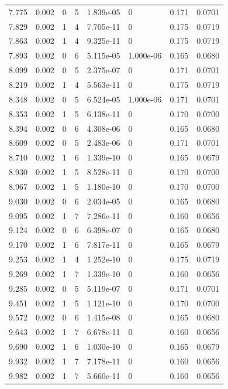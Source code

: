 \documentclass[preview]{standalone}
\begin{document}
{{{\begin{tabular}{L{1.2cm}C{1.2cm} C{0.3cm}C{0.5cm} C{1.4cm}C{1.4cm} C{1.4cm}C{1.4cm}}
  7.775  &  0.002  & 0     &  5 &  1.839e-05  & 0  & 0.171 &  0.0701   \\ 
  7.829  &  0.002  & 1     &  4 &  7.705e-11  & 0  & 0.175 &  0.0719   \\ 
  7.863  &  0.002  & 1     &  4 &  9.325e-11  & 0  & 0.175 &  0.0719   \\ 
  7.893  &  0.002  & 0     &  6 &  5.115e-05  & 1.000e-06  & 0.165 &  0.0680   \\ 
  8.099  &  0.002  & 0     &  5 &  2.375e-07  & 0  & 0.171 &  0.0701   \\ 
  8.219  &  0.002  & 1     &  4 &  5.563e-11  & 0  & 0.175 &  0.0719   \\ 
  8.348  &  0.002  & 0     &  5 &  6.524e-05  & 1.000e-06  & 0.171 &  0.0701   \\ 
  8.353  &  0.002  & 1     &  5 &  6.138e-11  & 0  & 0.170 &  0.0700   \\ 
  8.394  &  0.002  & 0     &  6 &  4.308e-06  & 0  & 0.165 &  0.0680   \\ 
  8.609  &  0.002  & 0     &  5 &  2.483e-06  & 0  & 0.171 &  0.0701   \\ 
  8.710  &  0.002  & 1     &  6 &  1.339e-10  & 0  & 0.165 &  0.0679   \\ 
  8.930  &  0.002  & 1     &  5 &  8.528e-11  & 0  & 0.170 &  0.0700   \\ 
  8.967  &  0.002  & 1     &  5 &  1.180e-10  & 0  & 0.170 &  0.0700   \\ 
  9.030  &  0.002  & 0     &  6 &  2.034e-05  & 0  & 0.165 &  0.0680   \\ 
  9.095  &  0.002  & 1     &  7 &  7.286e-11  & 0  & 0.160 &  0.0656   \\ 
  9.124  &  0.002  & 0     &  6 &  6.398e-07  & 0  & 0.165 &  0.0680   \\ 
  9.170  &  0.002  & 1     &  6 &  7.817e-11  & 0  & 0.165 &  0.0679   \\ 
  9.253  &  0.002  & 1     &  4 &  1.252e-10  & 0  & 0.175 &  0.0719   \\ 
  9.269  &  0.002  & 1     &  7 &  1.339e-10  & 0  & 0.160 &  0.0656   \\ 
  9.285  &  0.002  & 0     &  5 &  5.119e-07  & 0  & 0.171 &  0.0701   \\ 
  9.451  &  0.002  & 1     &  5 &  1.121e-10  & 0  & 0.170 &  0.0700   \\ 
  9.572  &  0.002  & 0     &  6 &  1.415e-08  & 0  & 0.165 &  0.0680   \\ 
  9.643  &  0.002  & 1     &  7 &  6.678e-11  & 0  & 0.160 &  0.0656   \\ 
  9.690  &  0.002  & 1     &  6 &  1.030e-10  & 0  & 0.165 &  0.0679   \\ 
  9.932  &  0.002  & 1     &  7 &  7.178e-11  & 0  & 0.160 &  0.0656   \\ 
  9.982  &  0.002  & 1     &  7 &  5.660e-11  & 0  & 0.160 &  0.0656   \\ 
\hline 
\end{tabular} 

}}}
\end{document}
